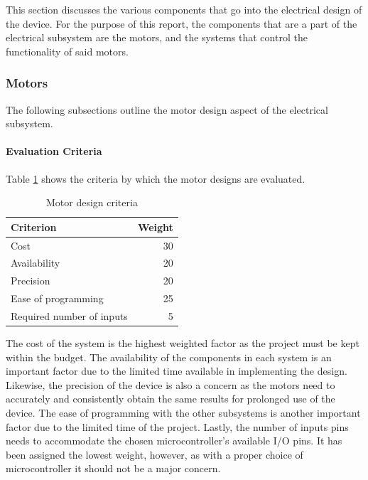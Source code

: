 \documentclass[11pt]{article}
\newcommand{\subsubsubsection}[1]{\paragraph{#1}\mbox{}}
\begin{document}
This section discusses the various components that go into the electrical design of the device.
For the purpose of this report, the components that are a part of the electrical subsystem are the motors, and the systems that control the functionality of said motors.

\subsubsection{Motors}

The following subsections outline the motor design aspect of the electrical subsystem.

\subsubsubsection{Evaluation Criteria}

\noindent
Table \ref{table:motor criteria} shows the criteria by which the motor designs are evaluated.

\begin{table}[H]
\begin{tabularx}{\textwidth}{X  r}

\hline

Criterion & Weight \\

\hline

Cost & 30 \\
Availability  & 20 \\
Precision & 20 \\
Ease of programming & 25 \\
Required number of inputs & 5 \\

\hline

\end{tabularx}
\caption{Motor design criteria}
\label{table:motor criteria}
\end{table}

The cost of the system is the highest weighted factor as the project must be kept within the budget.
The availability of the components in each system is an important factor due to the limited time available in implementing the design.
Likewise, the precision of the device is also a concern as the motors need to accurately and consistently obtain the same results for prolonged use of the device.
The ease of programming with the other subsystems is another important factor due to the limited time of the project.
Lastly, the number of inputs pins needs to accommodate the chosen microcontroller’s available I/O pins.
It has been assigned the lowest weight, however, as with a proper choice of microcontroller it should not be a major concern.
\end{document}

